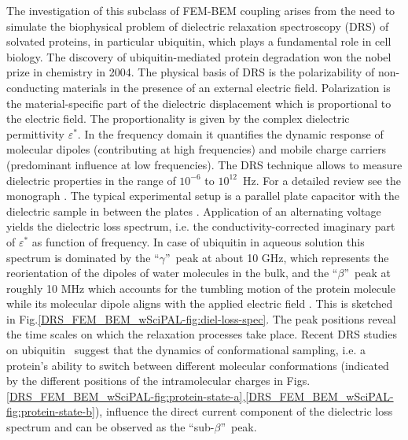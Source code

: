 \documentclass[runningheads]{lncse}
\newcommand{\mydiff}[2]{{}{#2}}
\begin{document}
The investigation of this subclass of FEM-BEM coupling arises from the need to simulate the biophysical problem of dielectric relaxation spectroscopy (DRS) of solvated proteins, in particular 
%
\mydiff{ubiquitin.}{ubiquitin, which plays a fundamental role in cell biology.
%
The discovery of ubiquitin-mediated protein degradation won the nobel prize in chemistry in 2004.
%
%
%
%
%
The physical basis of DRS is the polarizability of non-conducting materials in the presence of an external electric field.
%
Polarization is the material-specific part of the dielectric displacement which is proportional to the electric field.
%
The proportionality is given by the complex dielectric permittivity 
%
$\varepsilon^*$. 
%
In the frequency domain it quantifies the dynamic response of molecular dipoles (contributing at high frequencies) and mobile charge carriers (predominant influence at low frequencies).
%
The DRS technique allows to measure dielectric properties in the range of $10^{-6}$ to $10^{12}$~Hz.
%
For a detailed review see the monograph \cite{kremer2003broadband}.
%
The typical experimental setup is a parallel plate capacitor with the dielectric sample in between the plates \cite[Chapter 2]{kremer2003broadband}.
%
Application of an alternating voltage yields the dielectric loss spectrum, i.e. the conductivity-corrected imaginary part of 
$\varepsilon^*$ as function of frequency.
%
In case of ubiquitin in aqueous solution this spectrum is dominated by the ``$\gamma$''~peak at about 10 GHz, which represents the reorientation of the dipoles of water molecules in the bulk,
and the ``$\beta$''~peak at roughly 10 MHz which accounts for the tumbling motion of the protein molecule while its molecular dipole aligns with the applied electric field \cite{Knocks2001}. 
This is sketched in Fig.\ref{DRS_FEM_BEM_wSciPAL-fig:diel-loss-spec}.
%
The peak positions reveal the time scales on which the relaxation processes take place.
}
Recent DRS studies on \mydiff{ubiquitin}{ubiquitin~\cite{BanAngewChemIE2011}} 
suggest
 that the dynamics of conformational sampling, i.e. a protein's ability to switch between different molecular conformations (indicated by the different positions of the intramolecular charges in Figs.\ref{DRS_FEM_BEM_wSciPAL-fig:protein-state-a},\ref{DRS_FEM_BEM_wSciPAL-fig:protein-state-b}), influence the direct current component of the dielectric loss \mydiff{spectrum~\cite{BanAngewChemIE2011}}{spectrum} and can be observed as the ``sub-$\beta$''~peak.
\end{document}
